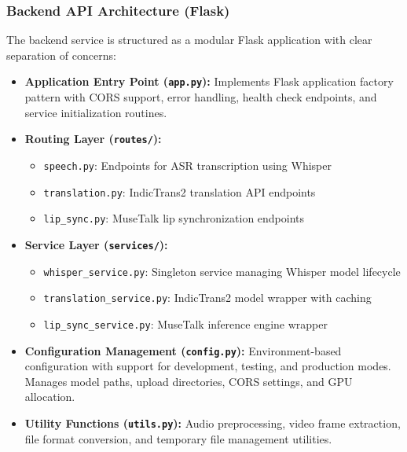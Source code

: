 \documentclass[12pt,oneside]{report}
\begin{document}
\subsubsection{Backend API Architecture (Flask)}

The backend service is structured as a modular Flask application with clear separation of concerns:

\begin{itemize}
    \item \textbf{Application Entry Point (\texttt{app.py}):} Implements Flask application factory pattern with CORS support, error handling, health check endpoints, and service initialization routines.
    
    \item \textbf{Routing Layer (\texttt{routes/}):}
    \begin{itemize}
        \item \texttt{speech.py}: Endpoints for ASR transcription using Whisper
        \item \texttt{translation.py}: IndicTrans2 translation API endpoints
        \item \texttt{lip\_sync.py}: MuseTalk lip synchronization endpoints
    \end{itemize}
    
    \item \textbf{Service Layer (\texttt{services/}):}
    \begin{itemize}
        \item \texttt{whisper\_service.py}: Singleton service managing Whisper model lifecycle
        \item \texttt{translation\_service.py}: IndicTrans2 model wrapper with caching
        \item \texttt{lip\_sync\_service.py}: MuseTalk inference engine wrapper
    \end{itemize}
    
    \item \textbf{Configuration Management (\texttt{config.py}):} Environment-based configuration with support for development, testing, and production modes. Manages model paths, upload directories, CORS settings, and GPU allocation.
    
    \item \textbf{Utility Functions (\texttt{utils.py}):} Audio preprocessing, video frame extraction, file format conversion, and temporary file management utilities.
\end{itemize}
\end{document}
